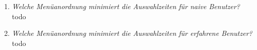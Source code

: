 \documentclass[a4paper,10pt]{article}
\begin{document}
\kopf
\renewcommand{\figurename}{Figure}

\begin{enumerate}
	\item \textit{Welche Menüanordnung minimiert die Auswahlzeiten für naive Benutzer?}\\
		todo
	\item \textit{Welche Menüanordnung minimiert die Auswahlzeiten für erfahrene Benutzer?}\\
		todo
\end{enumerate}
\end{document}
